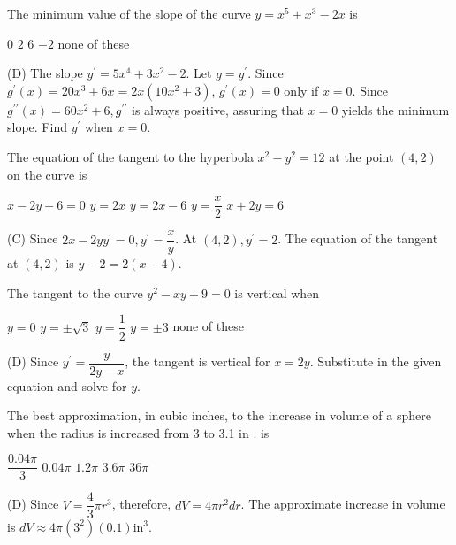 \question
The minimum value of the slope of the curve $y=x^{5}+x^{3}-2 x$ is
\begin{choices}
  \choice $0$
  \choice $2$
  \choice $6$
  \CorrectChoice $-2$
  \choice none of these
\end{choices}
\begin{solution}
(D) The slope $y^{\prime}=5 x^{4}+3 x^{2}-2$. Let $g=y^{\prime}$. Since $g^{\prime}(x)=20 x^{3}+6 x=2 x\left(10 x^{2}+3\right)$, $g^{\prime}(x)=0$ only if $x=0$. Since $g^{\prime \prime}(x)=60 x^{2}+6, g^{\prime \prime}$ is always positive, assuring that $x=0$ yields the minimum slope. Find $y^{\prime}$ when $x=0$.
\end{solution}

\question
The equation of the tangent to the hyperbola $x^{2}-y^{2}=12$ at the point $(4,2)$ on the curve is
\begin{choices}
  \choice $x-2 y+6=0$
  \choice $y=2 x$
  \CorrectChoice $y=2 x-6$
  \choice $y=\dfrac{x}{2}$
  \choice $x+2 y=6$
\end{choices}
\begin{solution}
(C) Since $2 x-2 y y^{\prime}=0, y^{\prime}=\dfrac{x}{y}$. At $(4,2), y^{\prime}=2$. The equation of the tangent at $(4,2)$ is $y-2=2(x-4)$.
\end{solution}


\newpage



\question
The tangent to the curve $y^{2}-x y+9=0$ is vertical when
\begin{choices}
  \choice $y=0$
  \choice $y= \pm \sqrt{3}$
  \choice $y=\dfrac{1}{2}$
  \CorrectChoice $y= \pm 3$
  \choice none of these
\end{choices}
\begin{solution}
(D) Since $y^{\prime}=\dfrac{y}{2 y-x}$, the tangent is vertical for $x=2 y$. Substitute in the given equation and solve for $y$.
\end{solution}

\question
The best approximation, in cubic inches, to the increase in volume of a sphere when the radius is increased from 3 to 3.1 in . is
\begin{choices}
  \choice $\dfrac{0.04 \pi}{3}$
  \choice $0.04 \pi$
  \choice $1.2 \pi$
  \CorrectChoice $3.6 \pi$
  \choice $36 \pi$
\end{choices}
\begin{solution}
(D) Since $V=\dfrac{4}{3} \pi r^{3}$, therefore, $d V=4 \pi r^{2} d r$. The approximate increase in volume is $d V \approx 4 \pi\left(3^{2}\right)(0.1) \mathrm{in}^{3}$.
\end{solution}

